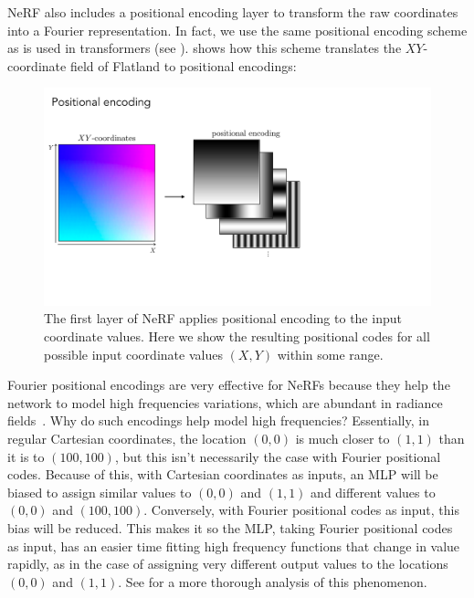 NeRF also includes a positional encoding layer to transform the raw coordinates into a Fourier representation. In fact, we use the same positional encoding scheme as is used in transformers (see \sect{\ref{sec:transformers:positional_encodings}}).
\Fig{\ref{fig:nerfs:flatland_positional_encoding}} shows how this scheme translates the $XY$-coordinate field of Flatland to positional encodings:
\begin{figure}[h!]
    \centerline{
        \includegraphics[width=0.7\linewidth]{figures/nerfs/flatland_positional_encoding.pdf}
    }
    \caption{The first layer of NeRF applies positional encoding to the input coordinate values. Here we show the resulting positional codes for all possible input coordinate values $(X,Y)$ within some range.}
    \label{fig:nerfs:flatland_positional_encoding}
\end{figure}

Fourier positional encodings are very effective for NeRFs because they help the network to model high frequencies variations, which are abundant in radiance fields~\cite{tancik2020fourier}. Why do such encodings help model high frequencies? Essentially, in regular Cartesian coordinates, the location $(0,0)$ is much closer to $(1,1)$ than it is to $(100,100)$, but this isn't necessarily the case with Fourier positional codes.
Because of this, with Cartesian coordinates as inputs, an MLP will be biased to assign similar values to $(0,0)$ and $(1,1)$ and different values to $(0,0)$ and $(100,100)$. Conversely, with Fourier
positional codes as input, this bias will be reduced. This makes it so the MLP, taking Fourier positional codes as input, has an easier time fitting high frequency functions that change in value rapidly, as in the case of assigning very different output values to the locations $(0,0)$ and $(1,1)$. See \cite{tancik2020fourier} for a more thorough analysis of this phenomenon.



